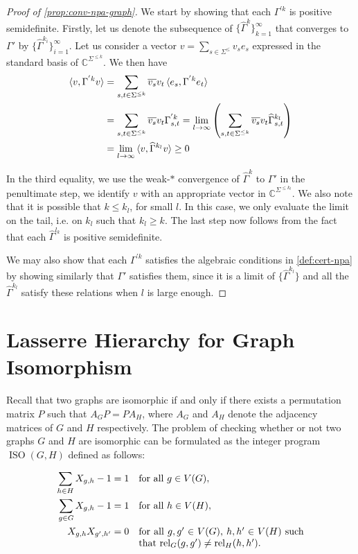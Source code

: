 \documentclass[a4paper,onecolumn,11pt,accepted=2026-01-06]{quantumarticle}
\theoremstyle{plain}
\theoremstyle{remark}
\theoremstyle{definition}
\DeclareMathOperator{\rel}{rel}
\DeclareMathOperator{\iso}{ISO}
\begin{document}
\begin{proof}[Proof of \ref{prop:conv-npa-graph}]
    We start by showing that each $\Gamma^{'k}$ is positive semidefinite. Firstly, let us denote the subsequence of $\{\widehat{\Gamma}^k\}_{k=1}^{\infty}$ that converges to $\Gamma'$ by $\{\widehat{\Gamma}^{k_i}\}_{i=1}^{\infty}$. Let us consider a vector $v = \sum_{s\in \Sigma^{\leq}} v_s e_s$ expressed in the standard basis of $\mathbb{C}^{\Sigma^{\leq k}}$. We then have 
    \begin{align*}
        \braket{v , \Gamma^{'k} v} & = \sum_{s, t \in \Sigma^{\leq k}} \overline{v_{s}}v_t \braket{e_s, \Gamma^{'k} e_t} \\
        & = \sum_{s, t \in \Sigma^{\leq k}} \overline{v_{s}}v_t \Gamma^{'k}_{s,t} = \lim_{l \to \infty }\left(\sum_{s, t \in \Sigma^{\leq k}} \overline{v_{s}}v_t \widehat{\Gamma}^{k_l}_{s,t} \right) \\
        & = \lim_{l \to \infty } \braket{v , \widehat{\Gamma}^{k_l} v}  \geq 0 
    \end{align*}

    In the third equality, we use the weak-$*$ convergence of $\widehat{\Gamma}^k$ to $\Gamma'$ in the penultimate step, we identify $v$ with an appropriate vector in $\mathbb{C}^{\Sigma^{\leq k_l}}$. We also note that it is possible that $k \leq k_l$, for small $l$. In this case, we only evaluate the limit on the tail, i.e. on $k_l$ such that $k_l \geq k$. The last step now follows from the fact that each $\widehat{\Gamma}^{l_k}$ is positive semidefinite.

    We may also show that each $\Gamma^{'k}$ satisfies the algebraic conditions in \cref{def:cert-npa} by showing similarly that $\Gamma'$ satisfies them, since it is a limit of $\{\widehat{\Gamma}^{k_l}\}$ and all the $\widehat{\Gamma}^{k_l}$ satisfy these relations when $l$ is large enough. 
\end{proof}

\section{Lasserre Hierarchy for Graph Isomorphism}\label{sec:lasserre}

Recall that two graphs are isomorphic if and only if there exists a permutation matrix $P$ such that $A_G P = P A_H$, where $A_G$ and $A_H$ denote the adjacency matrices of $G$ and $H$ respectively. The problem of checking whether or not two graphs $G$ and $H$ are isomorphic can be formulated as the integer program $\iso(G,H)$ defined as follows: 

\begin{align}
    \begin{aligned}
        \sum_{h \in H} X_{g,h} - 1 & = 1 && \text{for all } g\in V(G), \\
        \sum_{g \in G} X_{g,h} - 1 & = 1 && \text{for all } h\in V(H), \\
        X_{g,h}X_{g',h'} & = 0 && \parbox[t]{6cm}{for all $g,g' \in V(G)$, $h,h' \in V(H)$  such that $\rel_G(g,g') \neq \rel_H(h,h')$.}
    \end{aligned}
\end{align}
\end{document}
